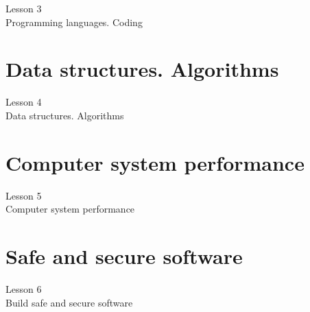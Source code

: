 \documentclass[aspectratio=1610]{beamer}
\begin{document}
\begin{frame}
\begin{center}
\Huge Lesson 3\\
Programming languages. Coding
\end{center}
\end{frame}




\section{Data structures. Algorithms}


\begin{frame}
\begin{center}
\Huge Lesson 4\\
Data structures. Algorithms
\end{center}
\end{frame}




\section{Computer system performance}
\begin{frame}
\begin{center}
\Huge Lesson 5\\
Computer system performance
\end{center}
\end{frame}



\section{Safe and secure software}
\begin{frame}
\begin{center}
\Huge Lesson 6\\
Build safe and secure software
\end{center}
\end{frame}
\end{document}
